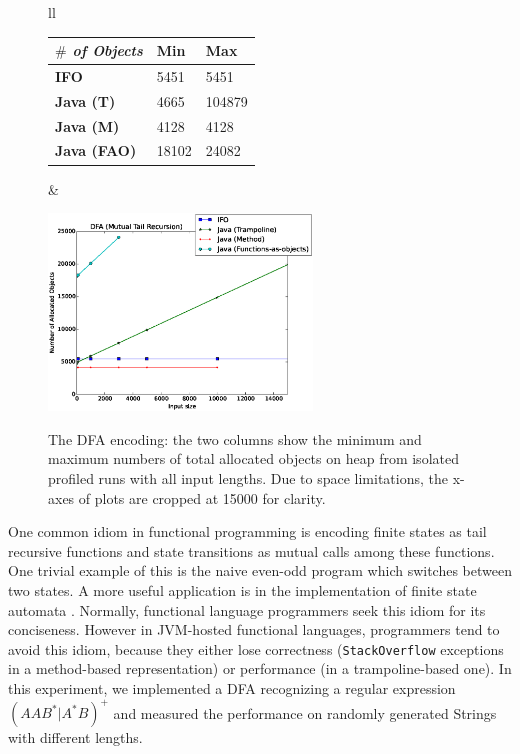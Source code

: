 \begin{figure}[h!t]
\vspace{10pt}
 \begin{center} 
 
 \begin{tabular}{ll}
  \begin{tabular}{|l|l|l|}
\hline
\multicolumn{1}{|r|}{\textit{\textbf{$\#$ of Objects}}} & Min & Max               \\ \hline
\textbf{IFO}                                  & 5451 & 5451    \\ \hline
\textbf{Java (T)}              & 4665 & 104879\\ \hline
\textbf{Java (M)}                  & 4128 & 4128                      \\ \hline
\textbf{Java (FAO)}                     & 18102 & 24082                       \\ \hline
\end{tabular}
   &
\begin{minipage}{7cm}{\includegraphics[width=7cm]{./src/img/dfa2an.eps}}\end{minipage} 
\end{tabular} 
 
 
 



\end{center}
\vspace{-15pt}
\caption{The DFA encoding: the two columns show the minimum and maximum numbers of total allocated objects on heap from isolated profiled runs with all input lengths. Due to space limitations, the x-axes of plots are cropped at 15000 for clarity.}

\label{fig:dfa}
\end{figure}

One common idiom in functional programming is encoding finite states
as tail recursive functions and state transitions as mutual calls
among these functions. One trivial example of this is the naive
even-odd program which switches between two states. A more useful
application is in the implementation of finite state automata
\cite{Krishnamurthi2006}. Normally, functional language programmers
seek this idiom for its conciseness. However in JVM-hosted functional
languages, programmers tend to avoid this idiom, because they either
lose correctness (\lstinline{StackOverflow} exceptions in a
method-based representation) or performance (in a trampoline-based
one). In this experiment, we implemented a DFA recognizing a regular
expression $(AAB^{*}|A^{*}B)^{+}$ and measured the performance on
randomly generated Strings with different lengths.

